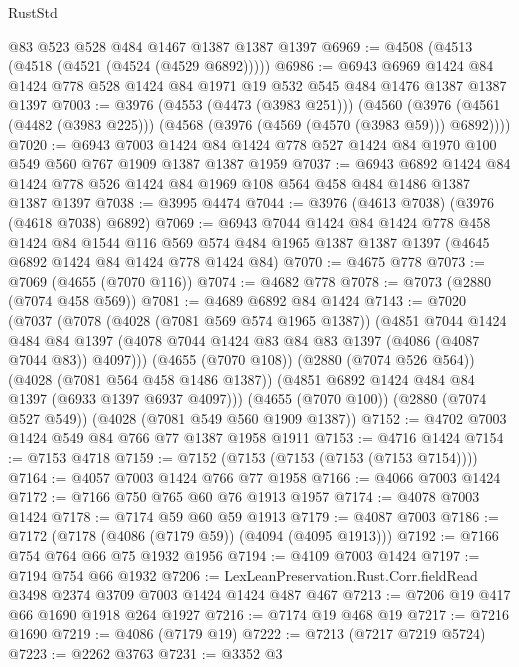 \begin{lexlean}{RustStd}
\begin{coremodule}
    @83
    @523
    @528
    @484
    @1467
    @1387
    @1387
    @1397
@6969 := @4508 (@4513 (@4518 (@4521 (@4524 (@4529 @6892)))))
@6986 := @6943
    @6969
    @1424
    @84
    @1424
    @778
    @528
    @1424
    @84
    @1971
    @19
    @532
    @545
    @484
    @1476
    @1387
    @1387
    @1397
@7003 := @3976
    (@4553 (@4473 (@3983 @251)))
    (@4560 (@3976 (@4561 (@4482 (@3983 @225))) (@4568 (@3976 (@4569 (@4570 (@3983 @59))) @6892))))
@7020 := @6943
    @7003
    @1424
    @84
    @1424
    @778
    @527
    @1424
    @84
    @1970
    @100
    @549
    @560
    @767
    @1909
    @1387
    @1387
    @1959
@7037 := @6943
    @6892
    @1424
    @84
    @1424
    @778
    @526
    @1424
    @84
    @1969
    @108
    @564
    @458
    @484
    @1486
    @1387
    @1387
    @1397
@7038 := @3995 @4474
@7044 := @3976 (@4613 @7038) (@3976 (@4618 @7038) @6892)
@7069 := @6943
    @7044
    @1424
    @84
    @1424
    @778
    @458
    @1424
    @84
    @1544
    @116
    @569
    @574
    @484
    @1965
    @1387
    @1387
    @1397
    (@4645 @6892 @1424 @84 @1424 @778 @1424 @84)
@7070 := @4675 @778
@7073 := @7069 (@4655 (@7070 @116))
@7074 := @4682 @778
@7078 := @7073 (@2880 (@7074 @458 @569))
@7081 := @4689 @6892 @84 @1424
@7143 := @7020
    (@7037
      (@7078
        (@4028 (@7081 @569 @574 @1965 @1387))
        (@4851
          @7044
          @1424
          @484
          @84
          @1397
          (@4078 @7044 @1424 @83 @84 @83 @1397 (@4086 (@4087 @7044 @83)) @4097)))
      (@4655 (@7070 @108))
      (@2880 (@7074 @526 @564))
      (@4028 (@7081 @564 @458 @1486 @1387))
      (@4851 @6892 @1424 @484 @84 @1397 (@6933 @1397 @6937 @4097)))
    (@4655 (@7070 @100))
    (@2880 (@7074 @527 @549))
    (@4028 (@7081 @549 @560 @1909 @1387))
@7152 := @4702 @7003 @1424 @549 @84 @766 @77 @1387 @1958 @1911
@7153 := @4716 @1424
@7154 := @7153 @4718
@7159 := @7152 (@7153 (@7153 (@7153 (@7153 @7154))))
@7164 := @4057 @7003 @1424 @766 @77 @1958
@7166 := @4066 @7003 @1424
@7172 := @7166 @750 @765 @60 @76 @1913 @1957
@7174 := @4078 @7003 @1424
@7178 := @7174 @59 @60 @59 @1913
@7179 := @4087 @7003
@7186 := @7172 (@7178 (@4086 (@7179 @59)) (@4094 (@4095 @1913)))
@7192 := @7166 @754 @764 @66 @75 @1932 @1956
@7194 := @4109 @7003 @1424
@7197 := @7194 @754 @66 @1932
@7206 := LexLeanPreservation.Rust.Corr.fieldRead @3498 @2374 @3709 @7003 @1424 @1424 @487 @467
@7213 := @7206 @19 @417 @66 @1690 @1918 @264 @1927
@7216 := @7174 @19 @468 @19
@7217 := @7216 @1690
@7219 := @4086 (@7179 @19)
@7222 := @7213 (@7217 @7219 @5724)
@7223 := @2262 @3763
@7231 := @3352
    @3

\end{coremodule}
\end{lexlean}
